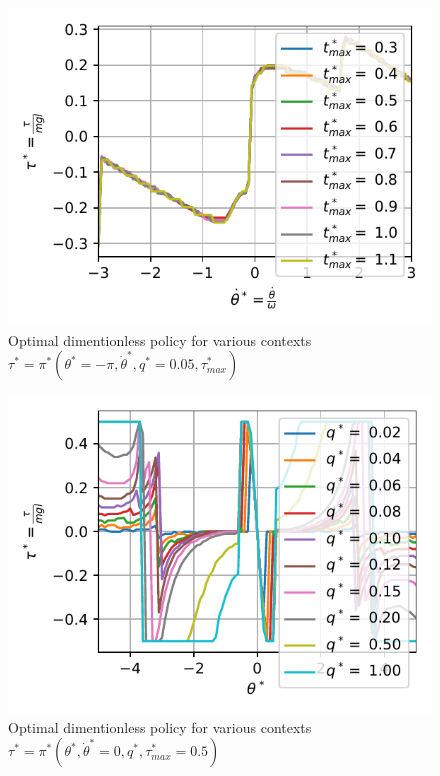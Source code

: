 \begin{figure}[ht]
\begin{center}
\includegraphics[width=0.99\linewidth]{fig/regime2.pdf}
\caption{Optimal dimentionless policy for various contexts  $\tau^* = \pi^*( \theta^* = -\pi , \dot{\theta}^* , q^* = 0.05 , \tau^*_{max} )$}\label{fig:regime2}
\end{center}
\end{figure}

\begin{figure}[ht]
\begin{center}
\includegraphics[width=0.99\linewidth]{fig/q_sensitivity.pdf}
\caption{Optimal dimentionless policy for various contexts  $\tau^* = \pi^*( \theta^*  , \dot{\theta}^* = 0 , q^*  , \tau^*_{max} = 0.5 )$}\label{fig:q_sensitivity}
\end{center}
\end{figure}


